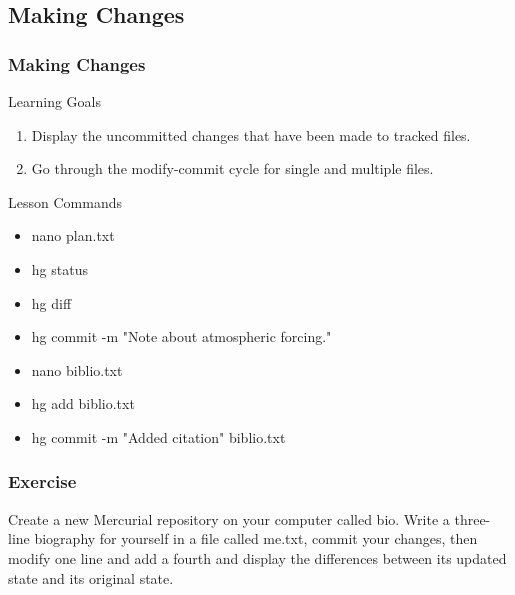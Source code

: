 \documentclass{beamer}
\begin{document}
\subsection*{Making Changes}
\begin{frame}
\frametitle{Making Changes}
\begin{block}{Learning Goals}
\begin{enumerate}
\item Display the uncommitted changes that have been made to tracked files.
\item Go through the modify-commit cycle for single and multiple files.
\end{enumerate}
\end{block}
\begin{block}{Lesson Commands}
\begin{multicols}{2}
\begin{itemize}
\item nano plan.txt
\item hg status
\item hg diff
\item hg commit -m "Note about atmospheric forcing."
\item nano biblio.txt
\item hg add biblio.txt
\item hg commit -m "Added citation" biblio.txt
\end{itemize}
\end{multicols}
\end{block}
\end{frame}

\begin{frame}
\frametitle{Exercise}
Create a new Mercurial repository on your computer called bio. Write a three-line biography for yourself in a file called me.txt, commit your changes, then modify one line and add a fourth and display the differences between its updated state and its original state.
\end{frame}
\end{document}
